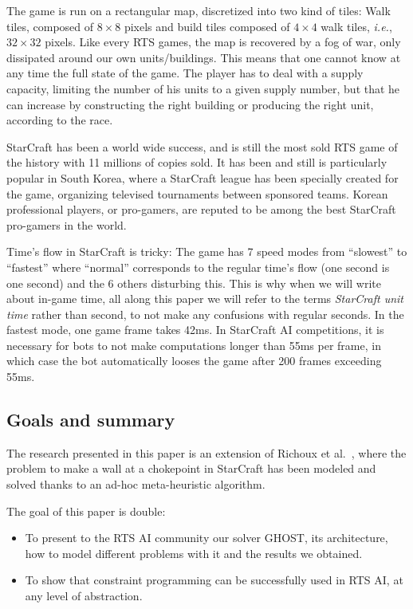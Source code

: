 \documentclass[journal]{IEEEtran}
\newcommand{\ghost}{\textsc{GHOST}\xspace}
\newcommand{\ie}{\textit{i.e.}}
\begin{document}
The game  is run on  a rectangular map,  discretized into two  kind of
tiles: Walk  tiles, composed of  $8 \times  8$ pixels and  build tiles
composed of $4 \times 4$ walk  tiles, \ie, $32 \times 32$ pixels. Like
every RTS games, the map is recovered by a fog of war, only dissipated
around our own units/buildings. This means that one cannot know at any
time the full state of the game.  The player has to deal with a supply
capacity, limiting the  number of his units to a  given supply number,
but  that  he can  increase  by  constructing  the right  building  or
producing the right unit, according to the race.

StarCraft has  been a world wide  success, and is still  the most sold
RTS game of the  history with 11 millions of copies  sold. It has been
and still  is particularly popular  in South Korea, where  a StarCraft
league has been  specially created for the  game, organizing televised
tournaments between  sponsored teams. Korean professional  players, or
pro-gamers, are reputed  to be among the best  StarCraft pro-gamers in
the world.

Time's flow  in StarCraft is tricky:  The game has 7  speed modes from
``slowest'' to ``fastest'' where ``normal'' corresponds to the regular
time's flow  (one second is  one second)  and the 6  others disturbing
this. This  is why when  we will write  about in-game time,  all along
this paper  we will  refer to  the terms {\it  StarCraft unit  time}
rather  than  second,   to  not  make  any   confusions  with  regular
seconds. In the fastest mode, one  game frame takes 42ms. In StarCraft
AI competitions,  it is  necessary for bots  to not  make computations
longer than 55ms per frame, in which case the bot automatically looses
the game after 200 frames exceeding 55ms.

\subsection{Goals and summary}

The research  presented in this  paper is  an extension of  Richoux et
al.~\cite{RichouxUO14},  where  the  problem  to  make  a  wall  at  a
chokepoint  in StarCraft  has been  modeled  and solved  thanks to  an
ad-hoc meta-heuristic algorithm.

The goal of this paper is double:
\begin{itemize}
\item  To present  to  the RTS  AI community  our  solver \ghost,  its
  architecture,  how  to model  different  problems  with it  and  the
  results we obtained.
\item To show that constraint  programming can be successfully used in
  RTS AI, at any level of abstraction.
\end{itemize}
\end{document}
